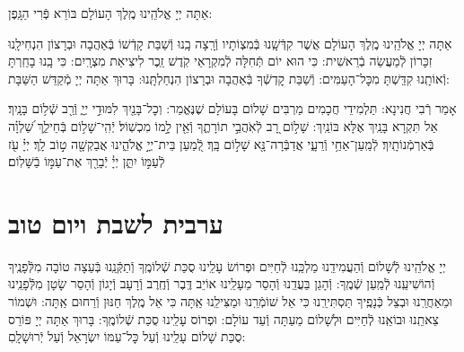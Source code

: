 \documentclass[twoside, openany, parskip=half, 11pt]{book}
\begin{document}

אַתָּה יְיָ אֱלֹהֵֽינוּ מֶֽלֶךְ הָעוֹלָם בּוֹרֵא פְּֿרִי הַגָּֽפֶן:

אַתָּה יְיָ אֱלֹהֵֽינוּ מֶֽלֶךְ הָעוֹלָם אֲשֶׁר קִדְּֿשָֽׁנוּ בְּֿמִצְוֹתָיו וְֿרָֽצָה בָֽנוּ וְֿשַׁבַּת קָדְֿשׁוֹ בְּֿאַהֲבָה וּבְרָצוֹן הִנְחִילָֽנוּ זִכָּרוֹן לְֿמַעֲשֵׂה בְֿרֵאשִׁית: כִּי הוּא יוֹם תְּֿחִלָּה לְֿמִקְרָאֵי קֹֽדֶשׁ זֵֽכֶר לִיצִיאַת מִצְרָֽיִם: כִּי בָֽנוּ בָחַֽרְתָּ וְֿאוֹתָֽנוּ קִדַּֽשְׁתָּ מִכׇּל־הָעַמִּים: וְֿשַׁבַּת קׇדְשְֿׁךָ בְּֿאַהֲבָה וּבְרָצוֹן הִנְחַלְתָּֽנוּ: בָּרוּךְ אַתָּה יְיָ מְֿקַדֵּשׁ הַשַּׁבָּת:

\sepline

 
אָמַר רְֿבִי חֲנִינָא: תַּלְמִידֵי חֲכָמִים מַרְבִּים שָׁלוֹם בָּעוֹלָם שֶׁנֶּאֱמַר:
וְכׇל־בָּנַ֖יִךְ לִמּוּדֵ֣י יְיָ֑ וְֿרַ֖ב שְֿׁל֥וֹם בָּנָֽיִךְ׃ אַל תִּקְרָא בָּנַֽיִךְ אֶלָּא בּוֹנַֽיִךְ: שָׁל֣וֹם רָ֭ב לְֿאֹֽהֲבֵ֣י תוֹרָתֶ֑ךָ וְֿאֵ֖ין לָ֣מוֹ מִכְשֽׁוֹל׃ יְֿהִֽי־שָׁל֥וֹם בְּֿחֵילֵ֑ךְ שַׁ֝לְוָ֗ה בְּֿאַרְמְֿנוֹתָֽיִךְ׃  לְֿמַֽעַן־אַחַ֥י וְֿרֵעָ֑י אֲדַבְּֿרָה־נָּ֖א שָׁל֣וֹם בָּֽךְ׃ לְֿ֭מַעַן בֵּית־יְיָ֣ אֱלֹהֵ֑ינוּ אֲבַקְשָׁ֖ה ט֣וֹב לָֽךְ׃
יְיָ֗ עֹ֖ז לְֿעַמּ֣וֹ יִתֵּ֑ן יְיָ֓ יְֿבָרֵ֖ךְ אֶת־עַמּ֣וֹ בַֿשָּׁלֽוֹם׃


\mournerskaddish

\vspace{\baselineskip}

{\let\clearpage\relax
\chapter[ערבית לשבת ויום טוב]{ ערבית לשבת ויום טוב }}

\barachu

\hamaarivaravim

\ahavasolam

\shema

\veahavta

\vehaya

\vayomer{}

\emesveemuna

 יְיָ אֱלֹהֵֽינוּ לְֿשָׁלוֹם וְֿהַעֲמִידֵֽנוּ מַלְכֵּֽנוּ לְֿחַיִּים וּפְרוֹשׂ עָלֵֽינוּ סֻכַּת שְֿׁלוֹמֶֽךָ וְֿתַקְּֿנֵֽנוּ בְּֿעֵצָה טוֹבָה מִלְּֿפָנֶֽיךָ וְֿהוֹשִׁיעֵֽנוּ לְֿמַֽעַן שְֿׁמֶֽךָ: וְֿהָגֵן בַּעֲדֵֽנוּ וְֿהָסֵר מֵעָלֵֽינוּ אוֹיֵב דֶּֽבֶר וְֿחֶֽרֶב וְֿרָעָב וְֿיָגוֹן וְֿהָסֵר שָׂטָן מִלְּֿֿפָנֵֽינוּ וּמֵאַחֲרֵֽנוּ וּבְצֵל כְּֿנָפֶֽיךָ תַּסְתִּירֵֽנוּ כִּי אֵל שׁוֹמְֿרֵֽנוּ וּמַצִּילֵֽנוּ אַֽתָּה כִּי אֵל מֶֽלֶךְ חַנּוּן וְֿרַחוּם אַֽתָּה:  וּשְׁמוֹר צֵאתֵֽנוּ וּבוֹאֵֽנוּ לְֿחַיִּים וּלְשָׁלוֹם מֵעַתָּה וְֿעַד עוֹלָם: וּפְרוֹס עָלֵֽינוּ סֻכַּת שְֿׁלוֹמֶֽךָ: בָּרוּךְ אַתָּה יְיָ פּוֹרֵס סֻכַּת שָׁלוֹם עָלֵֽינוּ וְֿעַל כׇּל־עַמּוֹ יִשְׂרָאֵל וְֿעַל יְֿרוּשָׁלָֽםִ:
\end{document}
